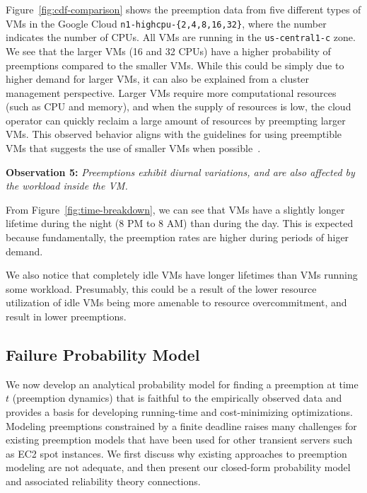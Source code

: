 \noindent Figure~\ref{fig:cdf-comparison} shows the preemption data from five different types of VMs in the Google Cloud \texttt{n1-highcpu-\{2,4,8,16,32\}}, where the number indicates the number of CPUs.
All VMs are running in the \texttt{us-central1-c} zone. 
We see that the larger VMs (16 and 32 CPUs) have a higher probability of preemptions compared to the smaller VMs.
While this could be simply due to higher demand for larger VMs, it can also be explained from a cluster management perspective. 
Larger VMs require more computational resources (such as CPU and memory), and when the supply of resources is low, the cloud operator can quickly reclaim a large amount of resources by preempting larger VMs.
This observed behavior aligns with the guidelines for using preemptible VMs that suggests the use of smaller VMs when possible~\cite{preemptible-documentation}. 

\noindent \textbf{Observation 5:} \emph{Preemptions exhibit diurnal variations, and are also affected by the workload inside the VM.}

\noindent From Figure~\ref{fig:time-breakdown}, we can see that VMs have a slightly longer lifetime during the night (8 PM to 8 AM) than during the day.
This is expected because fundamentally, the preemption rates are higher during periods of higer demand. 

We also notice that completely idle VMs have longer lifetimes than VMs running some workload.
Presumably, this could be a result of the lower resource utilization of idle VMs being more amenable to resource overcommitment, and result in lower preemptions. 



\vspace*{\subsecspace}
\subsection{Failure Probability Model}
\label{subsec:analytical-model}

We now develop an analytical probability model for finding a preemption at time $t$ (preemption dynamics) that is faithful to the empirically observed data and provides a basis for developing running-time and cost-minimizing optimizations. %
Modeling preemptions constrained by a finite deadline raises many challenges for existing preemption models that have been used for other transient servers such as EC2 spot instances. 
We first discuss why existing approaches to preemption modeling are not adequate, and then present our closed-form probability model and associated reliability theory connections. 

